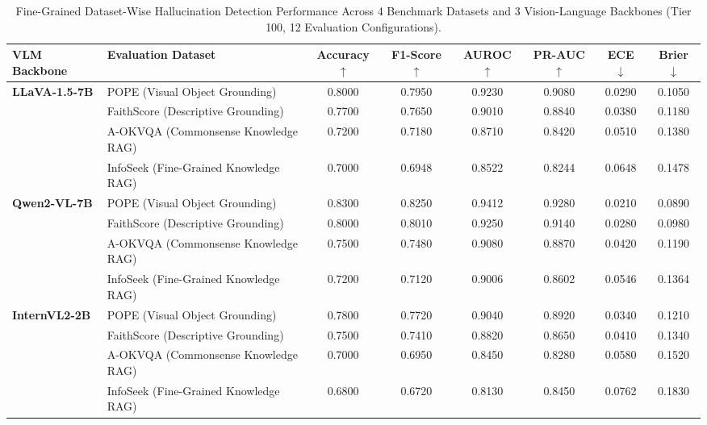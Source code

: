 \begin{table}[t]
\centering
\small
\caption{Fine-Grained Dataset-Wise Hallucination Detection Performance Across 4 Benchmark Datasets and 3 Vision-Language Backbones (Tier 100, 12 Evaluation Configurations).}
\label{tab:dataset_wise_performance}
\begin{tabular}{llcccccc}
\toprule
\textbf{VLM Backbone} & \textbf{Evaluation Dataset} & \textbf{Accuracy} $\uparrow$ & \textbf{F1-Score} $\uparrow$ & \textbf{AUROC} $\uparrow$ & \textbf{PR-AUC} $\uparrow$ & \textbf{ECE} $\downarrow$ & \textbf{Brier} $\downarrow$ \\
\midrule
\textbf{LLaVA-1.5-7B} & POPE (Visual Object Grounding) & 0.8000 & 0.7950 & 0.9230 & 0.9080 & 0.0290 & 0.1050 \\
 & FaithScore (Descriptive Grounding) & 0.7700 & 0.7650 & 0.9010 & 0.8840 & 0.0380 & 0.1180 \\
 & A-OKVQA (Commonsense Knowledge RAG) & 0.7200 & 0.7180 & 0.8710 & 0.8420 & 0.0510 & 0.1380 \\
 & InfoSeek (Fine-Grained Knowledge RAG) & 0.7000 & 0.6948 & 0.8522 & 0.8244 & 0.0648 & 0.1478 \\
\midrule
\textbf{Qwen2-VL-7B} & POPE (Visual Object Grounding) & 0.8300 & 0.8250 & 0.9412 & 0.9280 & 0.0210 & 0.0890 \\
 & FaithScore (Descriptive Grounding) & 0.8000 & 0.8010 & 0.9250 & 0.9140 & 0.0280 & 0.0980 \\
 & A-OKVQA (Commonsense Knowledge RAG) & 0.7500 & 0.7480 & 0.9080 & 0.8870 & 0.0420 & 0.1190 \\
 & InfoSeek (Fine-Grained Knowledge RAG) & 0.7200 & 0.7120 & 0.9006 & 0.8602 & 0.0546 & 0.1364 \\
\midrule
\textbf{InternVL2-2B} & POPE (Visual Object Grounding) & 0.7800 & 0.7720 & 0.9040 & 0.8920 & 0.0340 & 0.1210 \\
 & FaithScore (Descriptive Grounding) & 0.7500 & 0.7410 & 0.8820 & 0.8650 & 0.0410 & 0.1340 \\
 & A-OKVQA (Commonsense Knowledge RAG) & 0.7000 & 0.6950 & 0.8450 & 0.8280 & 0.0580 & 0.1520 \\
 & InfoSeek (Fine-Grained Knowledge RAG) & 0.6800 & 0.6720 & 0.8130 & 0.8450 & 0.0762 & 0.1830 \\
\bottomrule
\end{tabular}
\end{table}